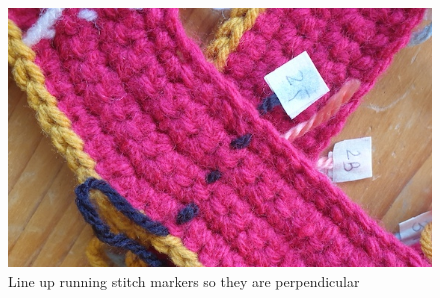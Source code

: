 \documentclass[openany]{book}
\begin{document}
\begin{figure}[H]
\centering
\includegraphics[width=.75\textwidth]{bk/line}
\caption{Line up running stitch markers so they are perpendicular}
\end{figure}
\end{document}
